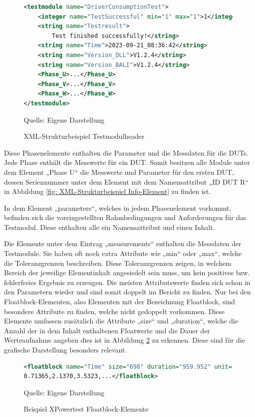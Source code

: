 \begin{figure}[H]
\centering
\begin{minipage}{0.95\textwidth}
\begin{lstlisting}[language=XML]
<testmodule name="DriverConsumptionTest">
	<integer name="TestSuccessful" min="1" max="1">1</integer>
	<string name="Testresult">
        Test finished successfully!</string>
	<string name="Time">2023-09-21_08:36:42</string>
	<string name="Version_DLL">V1.2.4</string>
	<string name="Version_BALI">V1.2.4</string>
    <Phase_U>...</Phase_U>
    <Phase_V>...</Phase_V>
    <Phase_W>...</Phase_W>
</testmodule>
\end{lstlisting}
\end{minipage}
\caption{XML-Strukturbeispiel Testmodulheader}
\label{fig: XML-Strukturbeispiel Testmodulheader}
    {Quelle: Eigene Darstellung}
\end{figure}

Diese Phasenelemente enthalten die Parameter und die Messdaten für die DUTs. Jede Phase enthält die Messwerte für ein DUT.
Somit besitzen alle Module unter dem Element „Phase U“ die Messwerte und Parameter für den ersten DUT, dessen Seriennummer
unter dem Element mit dem Namensattribut „ID DUT R“ in Abbildung \ref{fig: XML-Strukturbeispiel Info-Element} zu finden ist.

In dem Element „parameters“, welches in jedem Phasenelement vorkommt, befinden sich die voreingestellten Rahmbedingungen
und Anforderungen für das Testmodul. Diese enthalten alle ein Namensattribut und einen Inhalt.

Die Elemente unter dem Eintrag „measurements“ enthalten die Messdaten der Testmodule. Sie haben oft noch extra Attribute
wie „min“ oder „max“, welche die Toleranzgrenzen beschreiben. Diese Toleranzgrenzen zeigen, in welchem Bereich der jeweilige
Elementinhalt angesiedelt sein muss, um kein positives bzw. fehlerfreies Ergebnis zu erzeugen.
Die meisten Attributswerte finden sich schon in den Parametern wieder und sind somit doppelt im Bericht zu finden.
Nur bei den Floatblock-Elementen, also Elementen mit der Bezeichnung Floatblock, sind besondere Attribute zu finden,
welche nicht gedoppelt vorkommen.
Diese Elemente umfassen zusätzlich die Attribute „size“ und „duration“, welche die Anzahl der in dem Inhalt enthaltenen
Floatwerte und die Dauer der Werteaufnahme angeben dies ist in Abbildung \ref{fig: Beispiel XPowertest Floatblock-Elemente} zu erkennen.
Diese sind für die grafische Darstellung besonders relevant.

\begin{figure}[H]
\centering
\begin{minipage}{0.95\textwidth}
\begin{lstlisting}[language=XML]
<floatblock name="Time" size="698" duration="959.952" unit="s">
0.71365,2.1370,3.5323,...</floatblock>
\end{lstlisting}
\end{minipage}
\caption{Beispiel XPowertest Floatblock-Elemente}
\label{fig: Beispiel XPowertest Floatblock-Elemente}
    {Quelle: Eigene Darstellung}
\end{figure}

